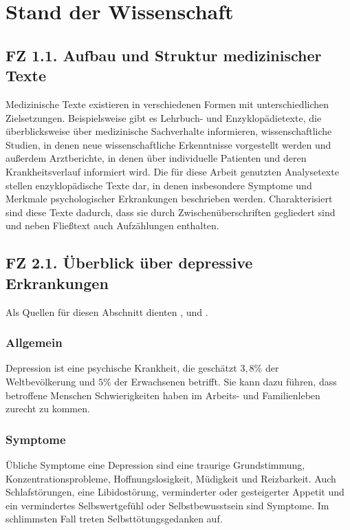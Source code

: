 \chapter{Stand der Wissenschaft}
\label{ch:standderwissenschaft} 


%
%
\section{FZ 1.1. Aufbau und Struktur medizinischer Texte}
\label{sec:fz1.1.} 

Medizinische Texte existieren in verschiedenen Formen mit unterschiedlichen Zielsetzungen. Beispielsweise gibt es Lehrbuch- und Enzyklopädietexte, die überblicksweise über medizinische Sachverhalte informieren, wissenschaftliche Studien, in denen neue wissenschaftliche Erkenntnisse vorgestellt werden und außerdem Arztberichte, in denen über individuelle Patienten und deren Krankheitsverlauf informiert wird.
Die für diese Arbeit genutzten Analysetexte stellen enzyklopädische Texte dar, in denen insbesondere Symptome und Merkmale psychologischer Erkrankungen beschrieben werden.
Charakterisiert sind diese Texte dadurch, dass sie durch Zwischenüberschriften gegliedert sind und neben Fließtext auch Aufzählungen enthalten.


%
%
\section{FZ 2.1. Überblick über depressive Erkrankungen}
\label{sec:fz2.1.} 
Als Quellen für diesen Abschnitt dienten \cite{mpg_depression}, \cite{who_depression} und \cite{psychrembel_depression}.
\subsection{Allgemein}
Depression ist eine psychische Krankheit, die geschätzt $3,8 \%$ der Weltbevölkerung und $5\%$ der Erwachsenen betrifft.
Sie kann dazu führen, dass betroffene Menschen Schwierigkeiten haben im Arbeits- und Familienleben zurecht zu
kommen.

\subsection{Symptome}
Übliche Symptome eine Depression sind eine traurige Grundstimmung, Konzentrationsprobleme, Hoffnungslosigkeit, 
Müdigkeit und Reizbarkeit. Auch Schlafstörungen, eine Libidostörung, verminderter oder gesteigerter Appetit und
ein vermindertes Selbswertgefühl oder Selbstbewusstsein sind Symptome. Im schlimmsten Fall treten 
Selbsttötungsgedanken auf.

